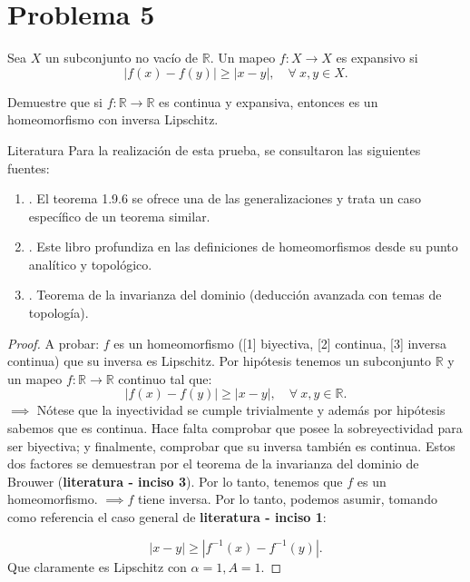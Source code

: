 \section{Problema 5}

\begin{tcolorbox}[colback=blue!15,colframe=blue!1!blue,title=Mapeo expansivo]
	Sea $X$ un subconjunto no vacío de $\mathbb{R}$. Un mapeo $f: X \rightarrow X$ es expansivo si
	$$
	|f(x)-f(y)| \geq|x-y|, \quad \forall \ x, y \in X.$$
\end{tcolorbox}

Demuestre que si  $f:\mathbb{R} \rightarrow \mathbb{R}$ es continua y expansiva, entonces es un homeomorfismo con inversa Lipschitz.
\begin{noter}{Literatura}
	Para la realización de esta prueba, se consultaron las siguientes fuentes: 
	\begin{enumerate}
		\item \cite{georgiev2020multiple}. El teorema 1.9.6 se ofrece una de las generalizaciones y trata un caso específico de un teorema similar. 
		\item \cite{carothers2000real}. Este libro profundiza en las definiciones de homeomorfismos desde su punto analítico y topológico.
		\item \cite{brouwer1911beweis}. Teorema de la invarianza del dominio (deducción avanzada con temas de topología). 
	\end{enumerate}
\end{noter}
\begin{proof}
	A probar: $f$ es un homeomorfismo ([1] biyectiva, [2] continua, [3] inversa continua) que su inversa es Lipschitz. Por hipótesis tenemos un subconjunto $\mathbb{R}$ y un mapeo $f: \mathbb{R}\to\mathbb{R}$ continuo tal que: 
	$$	|f(x)-f(y)| \geq|x-y|, \quad \forall \ x, y \in \mathbb{R}.$$
	$\implies $ Nótese que la inyectividad se cumple trivialmente y además por hipótesis sabemos que es continua. Hace falta comprobar que posee la sobreyectividad para ser biyectiva; y finalmente, comprobar que su inversa también es continua. Estos dos factores se demuestran por el teorema de la invarianza del dominio de Brouwer (\textbf{literatura - inciso 3}). Por lo tanto, tenemos que $f$ es un homeomorfismo. $\implies f$ tiene inversa. Por lo tanto, podemos asumir, tomando como referencia el caso general de \textbf{literatura - inciso 1}: 
	
	$$|x-y|\geq |f^{-1}(x)-f^{-1}(y)|.$$
	Que claramente es Lipschitz con $\alpha=1, A =1$. 
\end{proof}